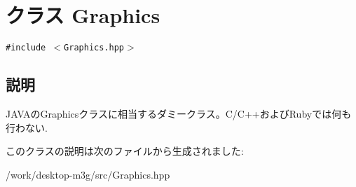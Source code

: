\hypertarget{classm3g_1_1Graphics}{
\section{クラス Graphics}
\label{classm3g_1_1Graphics}
}
{\tt \#include $<$Graphics.hpp$>$}



\subsection{説明}
JAVAのGraphicsクラスに相当するダミークラス。C/C++およびRubyでは何も行わない. 

このクラスの説明は次のファイルから生成されました:\begin{CompactItemize}
\item 
/work/desktop-m3g/src/Graphics.hpp\end{CompactItemize}
